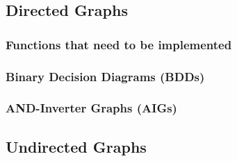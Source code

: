 \subsection{Directed Graphs}
\label{ssec:DirectedGraphs}



\subsubsection{Functions that need to be implemented}
\label{sssec:FunctionsThatNeedToBeImplemented}





\subsubsection{Binary Decision Diagrams (BDDs)}
\label{sssec:BinaryDecisionDiagramsBDDs}




\subsubsection{AND-Inverter Graphs (AIGs)}
\label{sssec:ANDInverterGraphsAIGs}













\subsection{Undirected Graphs}
\label{ssec:UndirectedGraphs}
















